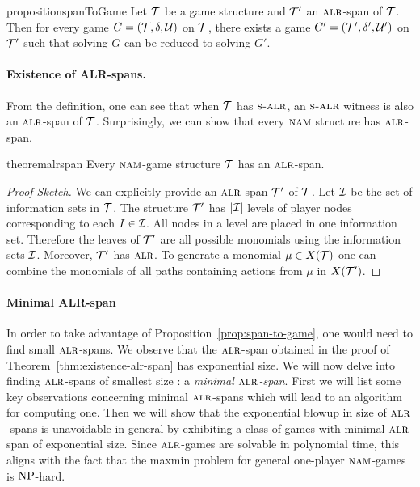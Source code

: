 \begin{restatable}{proposition}{spanToGame}\label{prop:span-to-game}
  Let $\mathcal{T}$ be a game structure and $\mathcal{T}'$ an $\textsc{alr}$-span of $\mathcal{T}$.
  Then for every game $G = (\mathcal{T}, \delta, \mathcal{U})$ on $\mathcal{T}$, there exists a game
  $G' = (\mathcal{T}', \delta', \mathcal{U}')$ on $\mathcal{T}'$ such that solving $G$ can be
  reduced to solving $G'$. \end{restatable}


\paragraph*{Existence of ALR-spans.} From the definition, one can
see that when $\mathcal{T}$ has $\textsc{s-alr}$, an $\textsc{s-alr}$ witness is
also an $\textsc{alr}$-span of $\mathcal{T}$. Surprisingly, we can show that every
$\textsc{nam}$ structure has $\textsc{alr}$-span.

\begin{restatable}{theorem}{alrspan}\label{thm:existence-alr-span}
  Every $\textsc{nam}$-game structure $\mathcal{T}$ has an $\textsc{alr}$-span.
\end{restatable}
\begin{proof}[Proof Sketch]
  We can explicitly provide an $\textsc{alr}$-span $\mathcal{T}'$ of $\mathcal{T}$.   Let $\mathcal{I}$ be the set of information sets in $\mathcal{T}$. The structure
  $\mathcal{T}'$ has $|\mathcal{I}|$ levels of player nodes corresponding to each $I
  \in \mathcal{I}$. All nodes in a level are placed in
  one information set. Therefore the leaves of $\mathcal{T}'$ are all possible
  monomials using the information sets $\mathcal{I}$. Moreover, $\mathcal{T}'$ has $\textsc{alr}$. To generate a monomial $\mu \in X(\mathcal{T})$
  one can combine the monomials of all paths containing actions from
  $\mu$ in $X(\mathcal{T}')$.
\end{proof}




\paragraph*{Minimal ALR-span} In order to take advantage of
Proposition~\ref{prop:span-to-game}, one would need to find small
$\textsc{alr}$-spans. We observe that the $\textsc{alr}$-span obtained in the proof of
Theorem~\ref{thm:existence-alr-span} has exponential size.  We will
now delve into finding $\textsc{alr}$-spans of smallest size : a \emph{minimal
  $\textsc{alr}$-span}.  First we will list some key observations concerning
minimal $\textsc{alr}$-spans which will lead to an algorithm for computing
one. Then we will show that the exponential blowup in size of
$\textsc{alr}$-spans is unavoidable in general by exhibiting a class of games
with minimal $\textsc{alr}$-span of exponential size. Since $\textsc{alr}$-games are solvable in polynomial time, this aligns with the fact that the maxmin problem for general one-player
  $\textsc{nam}$-games is $\operatorname{NP}$-hard.

